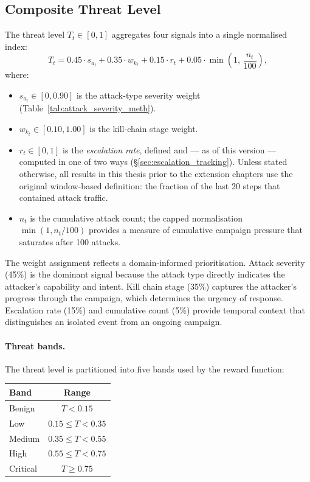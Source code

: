 \subsection{Composite Threat Level}
\label{sec:threat_level_def}

The threat level $T_t \in [0, 1]$ aggregates four signals into a single
normalised index:
%
\begin{equation}
  T_t = 0.45 \cdot s_{a_t}
      + 0.35 \cdot w_{k_t}
      + 0.15 \cdot r_t
      + 0.05 \cdot \min\!\left(1,\, \frac{n_t}{100}\right),
  \label{eq:threat}
\end{equation}
%
where:
\begin{itemize}
  \item $s_{a_t} \in [0, 0.90]$ is the attack-type severity weight
        (Table~\ref{tab:attack_severity_meth}).
  \item $w_{k_t} \in [0.10, 1.00]$ is the kill-chain stage weight.
  \item $r_t \in [0, 1]$ is the \emph{escalation rate}, defined and — as of
        this version — computed in one of two ways
        (\S\ref{sec:escalation_tracking}). Unless stated otherwise, all
        results in this thesis prior to the extension chapters use the
        original window-based definition: the fraction of the last 20
        steps that contained attack traffic.
  \item $n_t$ is the cumulative attack count; the capped normalisation
        $\min(1, n_t / 100)$ provides a measure of cumulative campaign
        pressure that saturates after 100 attacks.
\end{itemize}

The weight assignment reflects a domain-informed prioritisation.
Attack severity (45\%) is the dominant signal because the attack type
directly indicates the attacker's capability and intent.
Kill chain stage (35\%) captures the attacker's progress through the
campaign, which determines the urgency of response.
Escalation rate (15\%) and cumulative count (5\%) provide temporal context
that distinguishes an isolated event from an ongoing campaign.

\paragraph{Threat bands.}
The threat level is partitioned into five bands used by the reward function:

\begin{center}
\begin{tabular}{lc}
  \toprule
  Band & Range \\
  \midrule
  Benign & $T < 0.15$ \\
  Low    & $0.15 \leq T < 0.35$ \\
  Medium & $0.35 \leq T < 0.55$ \\
  High   & $0.55 \leq T < 0.75$ \\
  Critical & $T \geq 0.75$ \\
  \bottomrule
\end{tabular}
\end{center}

